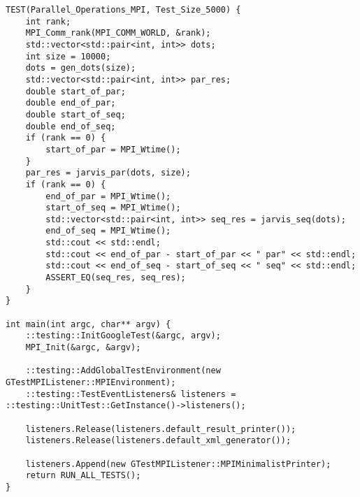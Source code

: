 \documentclass{report}
\begin{document}
\begin{lstlisting}
TEST(Parallel_Operations_MPI, Test_Size_5000) {
    int rank;
    MPI_Comm_rank(MPI_COMM_WORLD, &rank);
    std::vector<std::pair<int, int>> dots;
    int size = 10000;
    dots = gen_dots(size);
    std::vector<std::pair<int, int>> par_res;
    double start_of_par;
    double end_of_par;
    double start_of_seq;
    double end_of_seq;
    if (rank == 0) {
        start_of_par = MPI_Wtime();
    }
    par_res = jarvis_par(dots, size);
    if (rank == 0) {
        end_of_par = MPI_Wtime();
        start_of_seq = MPI_Wtime();
        std::vector<std::pair<int, int>> seq_res = jarvis_seq(dots);
        end_of_seq = MPI_Wtime();
        std::cout << std::endl;
        std::cout << end_of_par - start_of_par << " par" << std::endl;
        std::cout << end_of_seq - start_of_seq << " seq" << std::endl;
        ASSERT_EQ(seq_res, seq_res);
    }
}

int main(int argc, char** argv) {
    ::testing::InitGoogleTest(&argc, argv);
    MPI_Init(&argc, &argv);

    ::testing::AddGlobalTestEnvironment(new GTestMPIListener::MPIEnvironment);
    ::testing::TestEventListeners& listeners = ::testing::UnitTest::GetInstance()->listeners();

    listeners.Release(listeners.default_result_printer());
    listeners.Release(listeners.default_xml_generator());

    listeners.Append(new GTestMPIListener::MPIMinimalistPrinter);
    return RUN_ALL_TESTS();
}
\end{lstlisting}
\end{document}
